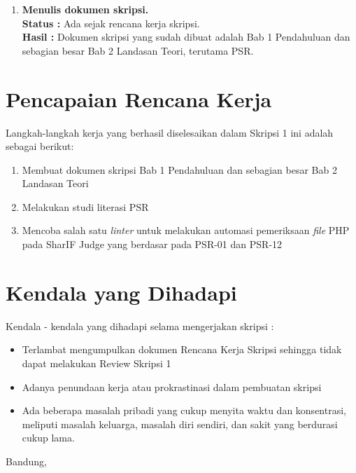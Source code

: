 \documentclass[a4paper,twoside]{article}
\begin{document}
\begin{enumerate}
		\item \textbf{Menulis dokumen skripsi.}\\
		{\bf Status :} Ada sejak rencana kerja skripsi.\\
		{\bf Hasil :} Dokumen skripsi yang sudah dibuat adalah Bab 1 Pendahuluan dan sebagian besar Bab 2 Landasan Teori, terutama PSR. 

	\end{enumerate}

\section{Pencapaian Rencana Kerja}
Langkah-langkah kerja yang berhasil diselesaikan dalam Skripsi 1 ini adalah sebagai berikut:
\begin{enumerate}
\item Membuat dokumen skripsi Bab 1 Pendahuluan dan sebagian besar Bab 2 Landasan Teori
\item Melakukan studi literasi PSR
\item Mencoba salah satu \textit{linter} untuk melakukan automasi pemeriksaan \textit{file} PHP pada SharIF Judge yang berdasar pada PSR-01 dan PSR-12
\end{enumerate}



\section{Kendala yang Dihadapi}
Kendala - kendala yang dihadapi selama mengerjakan skripsi :
\begin{itemize}
	\item Terlambat mengumpulkan dokumen Rencana Kerja Skripsi sehingga tidak dapat melakukan Review Skripsi 1
	\item Adanya penundaan kerja atau prokrastinasi dalam pembuatan skripsi
	\item Ada beberapa masalah pribadi yang cukup menyita waktu dan konsentrasi, meliputi masalah keluarga, masalah diri sendiri, dan sakit yang berdurasi cukup lama. 
	
\end{itemize}

\vspace{1cm}
\centering Bandung, \tanggal\\
\vspace{2cm} \nama \\ 
\vspace{1cm}
\end{document}
